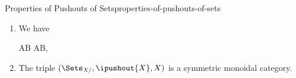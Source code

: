 \begin{proposition}{Properties of Pushouts of Sets}{properties-of-pushouts-of-sets}
\begin{enumerate}
        \item\label{properties-of-pushouts-of-sets-interaction-with-coproducts}We have
            \begin{webcompile}
                A\ipushout{\emptyset}B%
                \cong%
                A\icoprod B,%
                \quad
            \end{webcompile}
        \item\label{properties-of-pushouts-of-sets-symmetric-monoidality}The triple $(\Sets_{X/},\ipushout{X},X)$ is a symmetric monoidal category.
    \end{enumerate}
\end{proposition}
